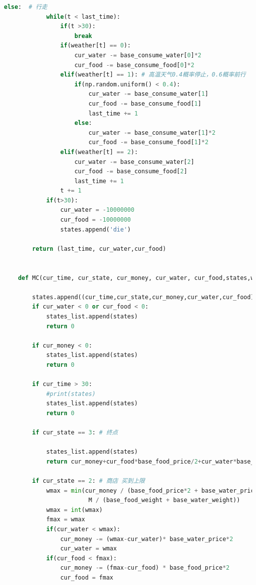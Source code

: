 \documentclass[withoutpreface,bwprint]{cumcmthesis} %
\begin{document}
\begin{appendices}
\begin{lstlisting}[language=python]
        else:  # 行走
            while(t < last_time):
                if(t >30):
                    break
                if(weather[t] == 0):
                    cur_water -= base_consume_water[0]*2
                    cur_food -= base_consume_food[0]*2
                elif(weather[t] == 1): # 高温天气0.4概率停止，0.6概率前行
                    if(np.random.uniform() < 0.4):
                        cur_water -= base_consume_water[1]
                        cur_food -= base_consume_food[1]
                        last_time += 1
                    else:
                        cur_water -= base_consume_water[1]*2
                        cur_food -= base_consume_food[1]*2
                elif(weather[t] == 2):
                    cur_water -= base_consume_water[2]
                    cur_food -= base_consume_food[2]
                    last_time += 1
                t += 1
            if(t>30):
                cur_water = -10000000
                cur_food = -10000000
                states.append('die')
                
        return (last_time, cur_water,cur_food)
    
    
    def MC(cur_time, cur_state, cur_money, cur_water, cur_food,states,weather):
    
        states.append((cur_time,cur_state,cur_money,cur_water,cur_food))
        if cur_water < 0 or cur_food < 0:
            states_list.append(states)
            return 0
    
        if cur_money < 0:
            states_list.append(states)
            return 0        
    
        if cur_time > 30:
            #print(states)
            states_list.append(states)
            return 0
    
        if cur_state == 3: # 终点
    
            states_list.append(states)
            return cur_money+cur_food*base_food_price/2+cur_water*base_water_price/2
    
        if cur_state == 2: # 商店 买到上限
            wmax = min(cur_money / (base_food_price*2 + base_water_price*2),
                        M / (base_food_weight + base_water_weight))
            wmax = int(wmax)
            fmax = wmax
            if(cur_water < wmax):
                cur_money -= (wmax-cur_water)* base_water_price*2
                cur_water = wmax
            if(cur_food < fmax):
                cur_money -= (fmax-cur_food) * base_food_price*2
                cur_food = fmax
    

\end{lstlisting}
\end{appendices}
\end{document}
